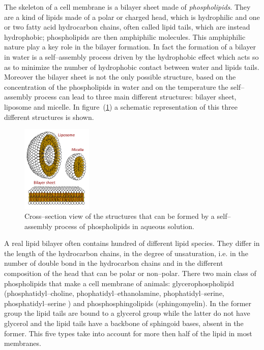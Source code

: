 The skeleton of a cell membrane is a bilayer sheet made of \textit{phospholipids}. They are a kind of lipids made of a polar or charged head, which is hydrophilic and one or two fatty acid hydrocarbon chains, often called lipid tails, which are instead hydrophobic; phospholipids are then amphiphilic molecules. This amphiphilic nature play a key role in the bilayer formation. In fact the formation of a bilayer in water is a self--assembly process driven by the hydrophobic effect which acts so as to minimize the number of hydrophobic contact between water and lipids tails. Moreover the bilayer sheet is not the only possible structure, based on the concentration of the phospholipids in water and on the temperature the self--assembly process can lead to three main different structures: bilayer sheet, liposome and micelle. In figure~(\ref{fig:lipidsStructures}) a schematic representation of this three different structures is shown.
\begin{figure}
	\includegraphics[width=0.3\textwidth]{./img/lipidsStructures}
	\caption{Cross--section view of the structures that can be formed by a self--assembly process of phospholipids in aqueous solution.}
	\label{fig:lipidsStructures}
\end{figure}

A real lipid bilayer often contains hundred of different lipid species. They differ in the length of the hydrocarbon chains, in the degree of unsaturation, i.e. in the number of double bond in the hydrocarbon chains and in the different composition of the head that can be polar or non--polar. There two main class of phospholipids that make a cell membrane of animals: glycerophospholipid (phosphatidyl--choline, phophatidyl--ethanolamine, phophatidyl--serine, phosphatidyl--serine ) and phosphosphingolipids (sphingomyelin). In the former group the lipid tails are bound to a glycerol group while the latter do not have glycerol and the lipid tails have a backbone of sphingoid bases, absent in the former. This five types take into account for more then half of the lipid in most membranes.

